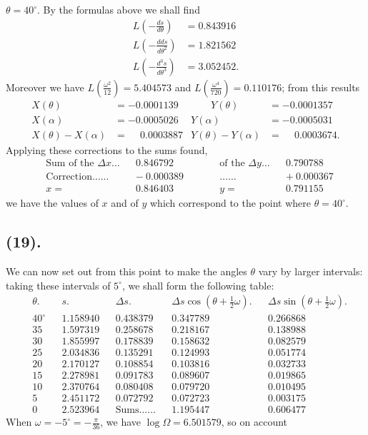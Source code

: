 \documentclass{article}
\begin{document}
$\theta=40^{\circ}$. By the formulas above we shall find
\[ \begin{aligned} L\left(-\frac{ds}{d\theta}\right)&=0.843916\\ L\left(-\frac{dds}{d\theta^{2}}\right)&=1.821562\\ L\left(-\frac{d^{3}s}{d\theta^{3}}\right)&=3.052452. \end{aligned} \]
Moreover we have $L\left(\frac{\omega^{2}}{12}\right)=5.404573$ and $L\left(\frac{\omega^{4}}{720}\right)=0.110176$; from this results
\[ \begin{aligned} X(\theta)&=-0.0001139 &\qquad Y(\theta)&=-0.0001357\\ X(\alpha)&=-0.0005026 & Y(\alpha)&=-0.0005031\\ X(\theta)-X(\alpha)&=\phantom{-}0.0003887 & Y(\theta)-Y(\alpha)&=\phantom{-}0.0003674. \end{aligned} \]
Applying these corrections to the sums found,
\[ \begin{aligned} &\text{Sum of the }\Delta x\ldots && 0.846792 &\qquad& \text{of the }\Delta y\ldots && 0.790788\\ &\text{Correction}\ldots\ldots && -\ 0.000389 && \ldots\ldots && +\ 0.000367\\ &x= && 0.846403 && y= && 0.791155 \end{aligned} \]
we have the values of $x$ and of $y$ which correspond to the point where $\theta=40^{\circ}$.

\subsection*{(19).}

We can now set out from this point to make the angles $\theta$ vary by larger intervals: taking these intervals of $5^{\circ}$, we shall form the following table:
\[ \begin{aligned} &\theta. && s. && \Delta s. && \Delta s\cos(\theta+\tfrac{1}{2}\omega). && \Delta s\sin(\theta+\tfrac{1}{2}\omega).\\ &40^{\circ} && 1.158940 && 0.438379 && 0.347789 && 0.266868\\ &35 && 1.597319 && 0.258678 && 0.218167 && 0.138988\\ &30 && 1.855997 && 0.178839 && 0.158632 && 0.082579\\ &25 && 2.034836 && 0.135291 && 0.124993 && 0.051774\\ &20 && 2.170127 && 0.108854 && 0.103816 && 0.032733\\ &15 && 2.278981 && 0.091783 && 0.089607 && 0.019865\\ &10 && 2.370764 && 0.080408 && 0.079720 && 0.010495\\ &5 && 2.451172 && 0.072792 && 0.072723 && 0.003175\\ &0 && 2.523964 && \text{Sums}\ldots\ldots && 1.195447 && 0.606477 \end{aligned} \]
When $\omega=-5^{\circ}=-\frac{\pi}{36}$, we have $\log\Omega=6.501579$, so on account
\end{document}
